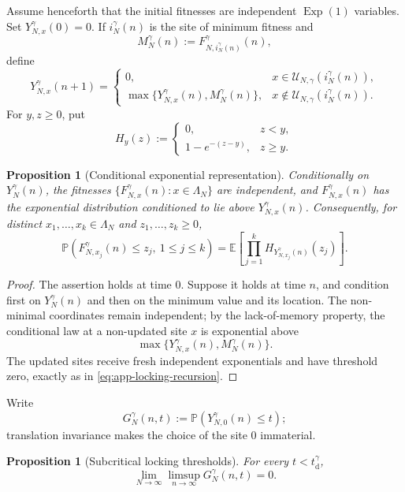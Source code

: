 \documentclass[11pt,a4paper]{amsart}
\newtheorem{proposition}[theorem]{Proposition}
\theoremstyle{remark}
\begin{document}
Assume henceforth that the initial fitnesses are independent
$\operatorname{Exp}(1)$ variables. Set $Y_{N,x}^\gamma(0)=0$. If
$i_N^\gamma(n)$ is the site of minimum fitness and
\[
        M_N^\gamma(n)
        :=F_{N,i_N^\gamma(n)}^\gamma(n),
\]
define
\begin{equation}
\label{eq:app-locking-recursion}
        Y_{N,x}^\gamma(n+1)
        =
        \begin{cases}
        0,
        &x\in\mathcal U_{N,\gamma}(i_N^\gamma(n)),\\
        \max\{Y_{N,x}^\gamma(n),M_N^\gamma(n)\},
        &x\notin\mathcal U_{N,\gamma}(i_N^\gamma(n)).
        \end{cases}
\end{equation}
For $y,z\geq0$, put
\[
        H_y(z)
        :=
        \begin{cases}
        0,&z<y,\\
        1-e^{-(z-y)},&z\geq y.
        \end{cases}
\]

\begin{proposition}[Conditional exponential representation]
\label{prop:app-locking-representation}
Conditionally on $Y_N^\gamma(n)$, the fitnesses
$\{F_{N,x}^\gamma(n):x\in\Lambda_N\}$ are independent, and
$F_{N,x}^\gamma(n)$ has the exponential distribution conditioned to lie
above $Y_{N,x}^\gamma(n)$. Consequently, for distinct
$x_1,\ldots,x_k\in\Lambda_N$ and $z_1,\ldots,z_k\geq0$,
\[
        \mathbb{P}(F_{N,x_j}^\gamma(n)\leq z_j,\ 1\leq j\leq k)
        =
        \mathbb{E}\left[
        \prod_{j=1}^kH_{Y_{N,x_j}^\gamma(n)}(z_j)
        \right].
\]
\end{proposition}

\begin{proof}
The assertion holds at time $0$. Suppose it holds at time $n$, and
condition first on $Y_N^\gamma(n)$ and then on the minimum value and its
location. The non-minimal coordinates remain independent; by the
lack-of-memory property, the conditional law at a non-updated site $x$ is
exponential above
\[
        \max\{Y_{N,x}^\gamma(n),M_N^\gamma(n)\}.
\]
The updated sites receive fresh independent exponentials and have threshold
zero, exactly as in \eqref{eq:app-locking-recursion}.
\end{proof}

Write
\[
        G_N^\gamma(n,t)
        :=\mathbb{P}(Y_{N,0}^\gamma(n)\leq t);
\]
translation invariance makes the choice of the site $0$ immaterial.

\begin{proposition}[Subcritical locking thresholds]
\label{prop:app-locking-below}
For every $t<t_{\mathrm d}^\gamma$,
\[
        \lim_{N\to\infty}
        \limsup_{n\to\infty}G_N^\gamma(n,t)=0.
\]
\end{proposition}
\end{document}
